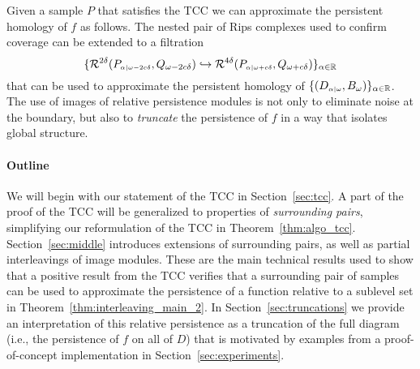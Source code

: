 Given a sample $P$ that satisfies the TCC we can approximate the persistent homology of $f$ as follows.
The nested pair of Rips complexes used to confirm coverage can be extended to a filtration
\[ \{\mathcal{R}^{2\delta}(P_{\scriptscriptstyle \alpha\mid \omega-2c\delta}, Q_{\omega-2c\delta})\hookrightarrow \mathcal{R}^{4\delta}(P_{\scriptscriptstyle \alpha\mid \omega+c\delta}, Q_{\omega+c\delta})\}_{\alpha\in\mathbb{R}}\]
that can be used to approximate the persistent homology of $\{(D_{\scriptscriptstyle \alpha\mid \omega}, B_\omega)\}_{\alpha\in\mathbb{R}}$.
The use of images of relative persistence modules is not only to eliminate noise at the boundary, but also to \emph{truncate} the persistence of $f$ in a way that isolates global structure.

\paragraph*{Outline}

We will begin with our statement of the TCC in Section~\ref{sec:tcc}.
A part of the proof of the TCC will be generalized to properties of \emph{surrounding pairs}, simplifying our reformulation of the TCC in Theorem~\ref{thm:algo_tcc}.
Section~\ref{sec:middle} introduces extensions of surrounding pairs, as well as partial interleavings of image modules.
These are the main technical results used to show that a positive result from the TCC verifies that a surrounding pair of samples can be used to approximate the persistence of a function relative to a sublevel set in Theorem~\ref{thm:interleaving_main_2}.
In Section~\ref{sec:truncations} we provide an interpretation of this relative persistence as a truncation of the full diagram (i.e., the persistence of $f$ on all of $D$) that is motivated by examples from a proof-of-concept implementation in Section~\ref{sec:experiments}.
